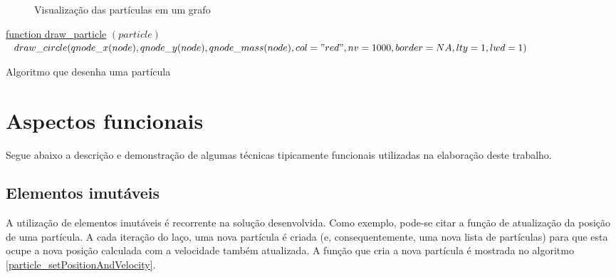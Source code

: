 \documentclass[rel_mlp]{iiufrgs}
\begin{document}
\begin{figure}[htb]
    \centering
    \caption{Visualização das partículas em um grafo}
    \label{fig:particulas.jpg}
\end{figure}


\begin{algorithm}
	\label{draw_particle}
    \underline{function draw{\_}particle} $(particle)$\;
  	$	draw{\_}circle(qnode{\_}x(node), qnode{\_}y(node), qnode{\_}mass (node), col="red", nv=1000, border = NA,lty=1,lwd=1) $\;
    \caption{Algoritmo que desenha uma partícula}
\end{algorithm}

\section{Aspectos funcionais}

	Segue abaixo a descrição e demonstração de algumas técnicas tipicamente funcionais utilizadas na elaboração deste trabalho.

    \subsection{Elementos imutáveis}

    A utilização de elementos imutáveis é recorrente na solução desenvolvida. Como exemplo, pode-se citar a função de atualização da posição de uma partícula. A cada iteração do laço, uma nova partícula é criada (e, consequentemente, uma nova lista de partículas) para que esta ocupe a nova posição calculada com a velocidade também atualizada. A função que cria a nova partícula é mostrada no algoritmo \ref{particle_setPositionAndVelocity}.
\end{document}
